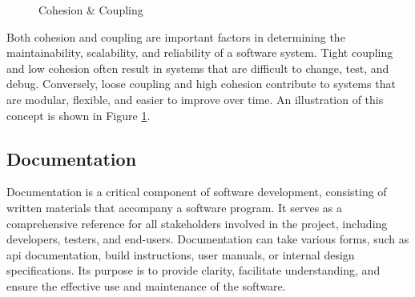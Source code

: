 \begin{figure}[h!]
    \centering

    \caption[Cohesion \& Coupling]{Cohesion \& Coupling \cite{geeksforgeeks:c&c}}
    \label{fig:cohesion-coupling}
\end{figure}

Both cohesion and coupling are important factors in determining the maintainability, scalability, and reliability of a software system. Tight coupling and low cohesion often result in systems that are difficult to change, test, and debug. Conversely, loose coupling and high cohesion contribute to systems that are modular, flexible, and easier to improve over time. An illustration of this concept is shown in Figure \ref{fig:cohesion-coupling}. \cite{geeksforgeeks:c&c}

\newpage

\subsection{Documentation}
\label{subsec:documentation}

Documentation is a critical component of software development, consisting of written materials that accompany a software program. It serves as a comprehensive reference for all stakeholders involved in the project, including developers, testers, and end-users. Documentation can take various forms, such as \gls{api} documentation, build instructions, user manuals, or internal design specifications. Its purpose is to provide clarity, facilitate understanding, and ensure the effective use and maintenance of the software. \cite{geeksforgeeks:doc} \\

